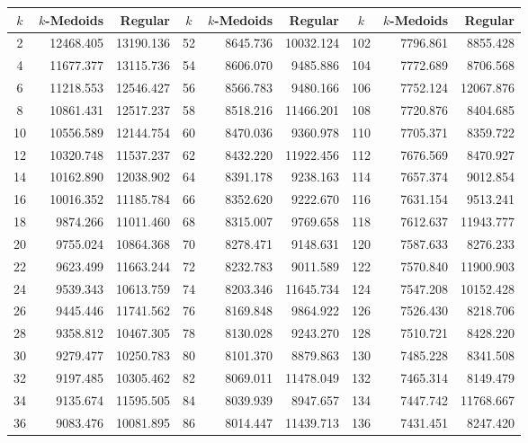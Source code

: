 \begin{table}[h]
	\centering
	\tiny
	\begin{tabular}{|c|r|r|c|r|r|c|r|r|}
		\hline
		$k$  & $k$-Medoids & Regular & $k$ & $k$-Medoids & Regular & $k$ & $k$-Medoids & Regular \\ \hline
		2  & 12468.405 & 13190.136 &  52 & 8645.736 & 10032.124 & 102 & 7796.861 &  8855.428 \\
		4  & 11677.377 & 13115.736 &  54 & 8606.070 &  9485.886 & 104 & 7772.689 &  8706.568 \\
		6  & 11218.553 & 12546.427 &  56 & 8566.783 &  9480.166 & 106 & 7752.124 & 12067.876 \\
		8  & 10861.431 & 12517.237 &  58 & 8518.216 & 11466.201 & 108 & 7720.876 &  8404.685 \\
		10 & 10556.589 & 12144.754 &  60 & 8470.036 &  9360.978 & 110 & 7705.371 &  8359.722 \\
		12 & 10320.748 & 11537.237 &  62 & 8432.220 & 11922.456 & 112 & 7676.569 &  8470.927 \\
		14 & 10162.890 & 12038.902 &  64 & 8391.178 &  9238.163 & 114 & 7657.374 &  9012.854 \\
		16 & 10016.352 & 11185.784 &  66 & 8352.620 &  9222.670 & 116 & 7631.154 &  9513.241 \\
		18 &  9874.266 & 11011.460 &  68 & 8315.007 &  9769.658 & 118 & 7612.637 & 11943.777 \\
		20 &  9755.024 & 10864.368 &  70 & 8278.471 &  9148.631 & 120 & 7587.633 &  8276.233 \\
		22 &  9623.499 & 11663.244 &  72 & 8232.783 &  9011.589 & 122 & 7570.840 & 11900.903 \\
		24 &  9539.343 & 10613.759 &  74 & 8203.346 & 11645.734 & 124 & 7547.208 & 10152.428 \\
		26 &  9445.446 & 11741.562 &  76 & 8169.848 &  9864.922 & 126 & 7526.430 &  8218.706 \\
		28 &  9358.812 & 10467.305 &  78 & 8130.028 &  9243.270 & 128 & 7510.721 &  8428.220 \\
		30 &  9279.477 & 10250.783 &  80 & 8101.370 &  8879.863 & 130 & 7485.228 &  8341.508 \\
		32 &  9197.485 & 10305.462 &  82 & 8069.011 & 11478.049 & 132 & 7465.314 &  8149.479 \\
		34 &  9135.674 & 11595.505 &  84 & 8039.939 &  8947.657 & 134 & 7447.742 & 11768.667 \\
		36 &  9083.476 & 10081.895 &  86 & 8014.447 & 11439.713 & 136 & 7431.451 &  8247.420 \\

\end{tabular}
\end{table}
